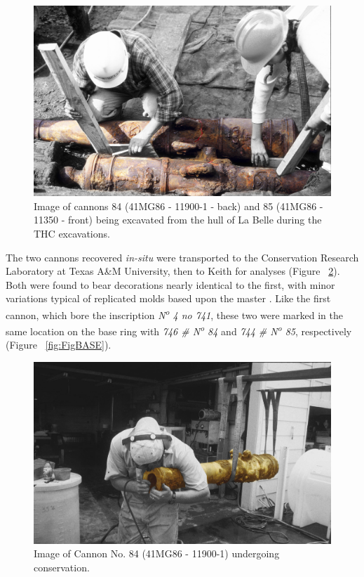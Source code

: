 \documentclass[review]{elsarticle}
\begin{document}
\begin{figure}[ht]\centering
\includegraphics[width=\linewidth]{FigExcavate2}
\caption{Image of cannons 84 (41MG86 - 11900-1 - back) and 85 (41MG86 - 11350 - front) being excavated from the hull of La Belle during the THC excavations.}
\label{fig:FigExcavate}
\end{figure}

The two cannons recovered \textit{in-situ} were transported to the Conservation Research Laboratory at Texas A\&M University, then to Keith for analyses (Figure ~\ref{fig:FigConserve}). Both were found to bear decorations nearly identical to the first, with minor variations typical of replicated molds based upon the master \citep[361]{RN5763}. Like the first cannon, which bore the inscription \textit{N\textsuperscript{o} 4 no 741}, these two were marked in the same location on the base ring with \textit{746 \# N\textsuperscript{o} 84} and \textit{744 \# N\textsuperscript{o} 85}, respectively (Figure ~\ref{fig:FigBASE}).

\begin{figure}[ht]\centering
\includegraphics[width=\linewidth]{FigConserve2}
\caption{Image of Cannon No. 84 (41MG86 - 11900-1) undergoing conservation.}
\label{fig:FigConserve}
\end{figure}
\end{document}
